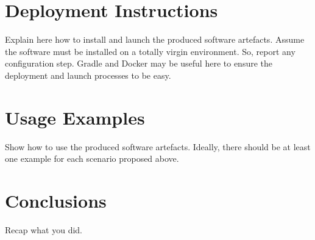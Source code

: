 \chapter{Deployment Instructions}
Explain here how to install and launch the produced software artefacts. Assume the
software must be installed on a totally virgin environment. So, report any configuration
step. Gradle and Docker may be useful here to ensure the deployment and launch
processes to be easy.

\chapter{Usage Examples}
Show how to use the produced software artefacts. Ideally, there should be at least one
example for each scenario proposed above.
\chapter{Conclusions}
Recap what you did.